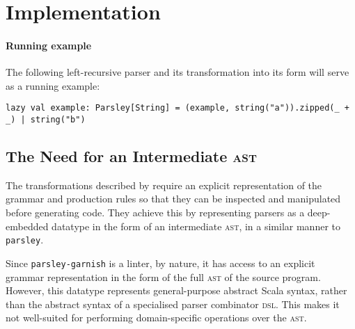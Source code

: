 \documentclass[../../main.tex]{subfiles}
\begin{document}
\label{sec:factor-leftrec}

\section{Implementation}

\paragraph{Running example}
The following left-recursive parser and its transformation into its  form will serve as a running example:
\begin{verbatim}
lazy val example: Parsley[String] = (example, string("a")).zipped(_ + _) | string("b")
\end{verbatim}

\subsection{The Need for an Intermediate \textsc{ast}}\label{sec:parser-ast-motivation}
The transformations described by \textcite{baars_leftrec_2004} require an explicit representation of the grammar and production rules so that they can be inspected and manipulated before generating code.
They achieve this by representing parsers as a deep-embedded datatype in the form of an intermediate \textsc{ast}, in a similar manner to \texttt{parsley}.

Since \texttt{parsley-garnish} is a linter, by nature, it has access to an explicit grammar representation in the form of the full  \textsc{ast} of the source program.
However, this datatype represents general-purpose abstract Scala syntax, rather than the abstract syntax of a specialised parser combinator \textsc{dsl}.
This makes it not well-suited for performing domain-specific operations over the \textsc{ast}.
\end{document}
